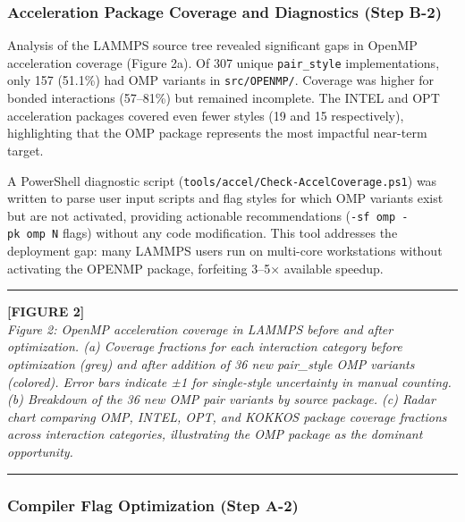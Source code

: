 \documentclass[
  11pt,
]{article}
\begin{document}
\subsubsection{Acceleration Package Coverage and Diagnostics (Step
B-2)}\label{acceleration-package-coverage-and-diagnostics-step-b-2}

Analysis of the LAMMPS source tree revealed significant gaps in OpenMP
acceleration coverage (Figure 2a). Of 307 unique \texttt{pair\_style}
implementations, only 157 (51.1\%) had OMP variants in
\texttt{src/OPENMP/}. Coverage was higher for bonded interactions
(57--81\%) but remained incomplete. The INTEL and OPT acceleration
packages covered even fewer styles (19 and 15 respectively),
highlighting that the OMP package represents the most impactful
near-term target.

A PowerShell diagnostic script
(\texttt{tools/accel/Check-AccelCoverage.ps1}) was written to parse user
input scripts and flag styles for which OMP variants exist but are not
activated, providing actionable recommendations
(\texttt{-sf\ omp\ -pk\ omp\ N} flags) without any code modification.
This tool addresses the deployment gap: many LAMMPS users run on
multi-core workstations without activating the OPENMP package,
forfeiting 3--5× available speedup.

\begin{center}\rule{0.5\linewidth}{0.5pt}\end{center}

\textbf{{[}FIGURE 2{]}}\\
\emph{Figure 2: OpenMP acceleration coverage in LAMMPS before and after
optimization. (a) Coverage fractions for each interaction category
before optimization (grey) and after addition of 36 new pair\_style OMP
variants (colored). Error bars indicate ±1 for single-style uncertainty
in manual counting. (b) Breakdown of the 36 new OMP pair variants by
source package. (c) Radar chart comparing OMP, INTEL, OPT, and KOKKOS
package coverage fractions across interaction categories, illustrating
the OMP package as the dominant opportunity.}

\begin{center}\rule{0.5\linewidth}{0.5pt}\end{center}

\subsubsection{Compiler Flag Optimization (Step
A-2)}\label{compiler-flag-optimization-step-a-2}
\end{document}
